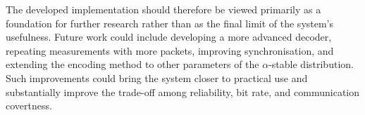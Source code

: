 \documentclass[a4paper, 12pt, openany]{book}
\begin{document}
The developed implementation should therefore be viewed primarily as a foundation for further research rather than as the final limit of the system's usefulness. Future work could include developing a more advanced decoder, repeating measurements with more packets, improving synchronisation, and extending the encoding method to other parameters of the $\alpha$-stable distribution. Such improvements could bring the system closer to practical use and substantially improve the trade-off among reliability, bit rate, and communication covertness.


\cleardoublepage
{}
\nocite{*}
\renewcommand{\bibname}{References}


\end{document}
